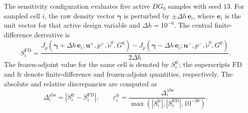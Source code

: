 	The sensitivity configuration evaluates five active $DG_0$ samples with seed $13$. For sampled cell $i$, the raw density vector $\boldsymbol{\gamma}$ is perturbed by $\pm\Delta h\,\mathbf{e}_i$, where $\mathbf{e}_i$ is the unit vector for that active design variable and $\Delta h=10^{-6}$. The central finite-difference derivative is
\begin{equation}
	S_i^{\mathrm{FD}}
	=
	\frac{
			J_p\!\left(\boldsymbol{\gamma}+\Delta h\,\mathbf{e}_i;
			\mathbf{u}^{+},p^{+},\tilde{\nu}^{0},G^{0}\right)
		-
			J_p\!\left(\boldsymbol{\gamma}-\Delta h\,\mathbf{e}_i;
			\mathbf{u}^{-},p^{-},\tilde{\nu}^{0},G^{0}\right)
	}{
		2\Delta h
	}.
	\label{eq:alexandersen_pipebend_fd_metric}
\end{equation}
The frozen-adjoint value for the same cell is denoted by $S_i^{\mathrm{fr}}$; the superscripts $\mathrm{FD}$ and $\mathrm{fr}$ denote finite-difference and frozen-adjoint quantities, respectively. The absolute and relative discrepancies are computed as
\begin{equation}
	\Delta_i^{\mathrm{abs}} =
	\left|S_i^{\mathrm{fr}}-S_i^{\mathrm{FD}}\right|,
	\qquad
	\varepsilon_i^{\mathrm{fr}}
	=
	\frac{\Delta_i^{\mathrm{abs}}}
	{\max\!\left(\left|S_i^{\mathrm{fr}}\right|,\left|S_i^{\mathrm{FD}}\right|,10^{-30}\right)} .
	\label{eq:alexandersen_pipebend_fd_relative_error}
\end{equation}


